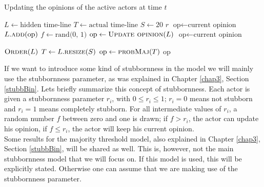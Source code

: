 \documentclass[11 pt , letterpaper , twoside , openright]{book}
\begin{document}
\begin{algorithm}
\caption{Updating the opinions of the active actors at time $t$}
\label{alg:update}
\begin{algorithmic}[1]
	\State \(L \leftarrow \text{hidden time-line}\)
	\State \(T \leftarrow \text{actual time-line}\)
	\State \(S \leftarrow 20\) 
	\State \(r\) 
		\State \(\text{op} \leftarrow \text{current opinion}\)
		 
			\State \(L.\textsc{add}\text{(op)}\)
		\EndFor
		\State \(f \leftarrow \text{rand(0, 1)}\) 
			\State \(\text{op} \leftarrow \Call{Update opinion}{L}\) 
		\Else
			\State \(\text{op} \leftarrow \text{current opinion}\) 
		\EndIf
	\EndFor
	
		\State \(\textsc{Order}(L)\) 
			\State \(T \leftarrow L.\textsc{resize}(S)\) 
		\EndIf
		\State \(\text{op} \leftarrow \textsc{probMaj}(T)\) 
	\State \Return op 
	\EndFunction
\end{algorithmic}
\end{algorithm}
\noindent
If we want to introduce some kind of stubbornness in the model we will mainly use the stubbornness parameter, as was explained in Chapter \ref{chap3}, Section \ref{stubbBin}. Lets briefly summarize this concept of stubbornness. Each actor is given a stubbornness parameter $r_i$, with $0 \leqslant r_i \leqslant 1$; $r_i = 0$ means not stubborn and $r_i = 1$ means completely stubborn. For all intermediate values of $r_i$, a random number $f$ between zero and one is drawn; if $f > r_i$, the actor can update his opinion, if $f \leqslant r_i$, the actor will keep his current opinion.\\
\newline
Some results for the majority threshold model, also explained in Chapter \ref{chap3}, Section \ref{stubbBin}, will be shared as well. This is, however, not the main stubbornness model that we will focus on. If this model is used, this will be explicitly stated. Otherwise one can assume that we are making use of the stubbornness parameter.\\
\end{document}
